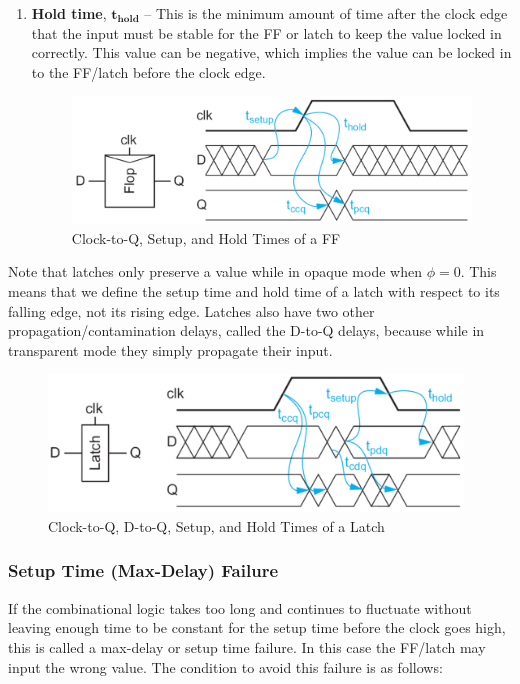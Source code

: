 \documentclass{article}
\begin{document}
\begin{enumerate}
\item \textbf{Hold time}, $\mathbf{t_{hold}}$ -- This is the minimum amount of time after the clock edge that the input must be stable for the FF or latch to keep the value locked in correctly. This value can be negative, which implies the value can be locked in to the FF/latch before the clock edge. 

\begin{figure}[ht!]
\centering
\includegraphics[width=110mm]{Setup.png}
\caption{Clock-to-Q, Setup, and Hold Times of a FF}
\end{figure}

\end{enumerate} 

Note that latches only preserve a value while in opaque mode when $\phi=0$. This means that we define the setup time and hold time of a latch with respect to its falling edge, not its rising edge. Latches also have two other propagation/contamination delays, called the D-to-Q delays, because while in transparent mode they simply propagate their input. 

\begin{figure}[ht!]
\centering
\includegraphics[width=110mm]{LatchDel.png}
\caption{Clock-to-Q, D-to-Q, Setup, and Hold Times of a Latch}
\end{figure}

\subsubsection{Setup Time (Max-Delay) Failure}

If the combinational logic takes too long and continues to fluctuate without leaving enough time to be constant for the setup time before the clock goes high, this is called a max-delay or setup time failure. In this case the FF/latch may input the wrong value. The condition to avoid this failure is as follows:
\end{document}
